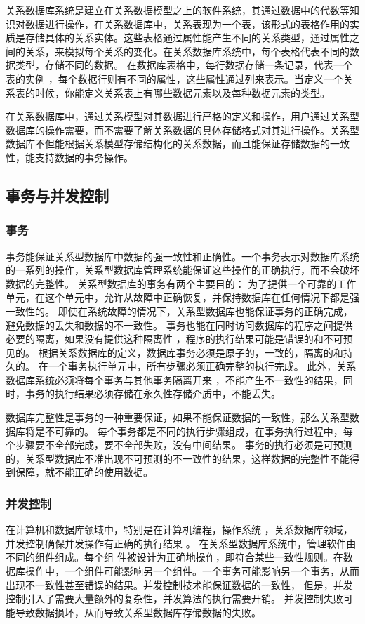 关系数据库系统是建立在关系数据模型之上的软件系统，其通过数据中的代数等知识对数据进行操作，在关系数据库中，关系表现为一个表，该形式的表格作用的实质是存储具体的关系实体。这些表格通过属性能产生不同的关系类型，通过属性之间的关系，来模拟每个关系的变化。在关系数据库系统中，每个表格代表不同的数据类型，存储不同的数据。 在数据库表格中，每行数据存储一条记录，代表一个表的实例
，每个数据行则有不同的属性，这些属性通过列来表示。当定义一个关系表的时候，你能定义关系表上有哪些数据元素以及每种数据元素的类型。

在关系数据库中，通过关系模型对其数据进行严格的定义和操作，用户通过关系型数据库的操作需要，而不需要了解关系数据的具体存储格式对其进行操作。关系型数据库不但能根据关系模型存储结构化的关系数据，而且能保证存储数据的一致性，能支持数据的事务操作。
\subsection{事务与并发控制}
\subsubsection{事务}
事务能保证关系型数据库中数据的强一致性和正确性。一个事务表示对数据库系统的一系列的操作，关系型数据库管理系统能保证这些操作的正确执行，而不会破坏数据的完整性。
关系型数据库的事务有两个主要目的：
为了提供一个可靠的工作单元，在这个单元中，允许从故障中正确恢复，并保持数据库在任何情况下都是强一致性的。
即使在系统故障的情况下，关系型数据库也能保证事务的正确完成，避免数据的丢失和数据的不一致性。
事务也能在同时访问数据库的程序之间提供必要的隔离，如果没有提供这种隔离性
，程序的执行结果可能是错误的和不可预见的。
根据关系数据库的定义，数据库事务必须是原子的，一致的，隔离的和持久的。
在一个事务执行单元中，所有步骤必须正确完整的执行完成。
此外，关系数据库系统必须将每个事务与其他事务隔离开来
，不能产生不一致性的结果，同时，事务的执行结果必须存储在永久性存储介质中，不能丢失。

数据库完整性是事务的一种重要保证，如果不能保证数据的一致性，那么关系型数据库将是不可靠的。
每个事务都是不同的执行步骤组成，在事务执行过程中，每个步骤要不全部完成，要不全部失败，没有中间结果。
事务的执行必须是可预测的，关系型数据库不准出现不可预测的不一致性的结果，这样数据的完整性不能得到保障，就不能正确的使用数据。
\subsubsection{并发控制}
在计算机和数据库领域中，特别是在计算机编程，操作系统
，关系数据库领域，并发控制确保并发操作有正确的执行结果
。
在关系型数据库系统中，管理软件由不同的组件组成。每个组
件被设计为正确地操作，即符合某些一致性规则。在数据库操作中，一个组件可能影响另一个组件。一个事务可能影响另一个事务，从而出现不一致性甚至错误的结果。并发控制技术能保证数据的一致性，
但是，并发控制引入了需要大量额外的复杂性，并发算法的执行需要开销。
并发控制失败可能导致数据损坏，从而导致关系型数据库存储数据的失败。

